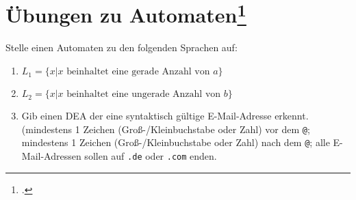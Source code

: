 \documentclass{lehramt-informatik-aufgabe}
\begin{document}
%

\section{Übungen zu Automaten\footcite[Seite 28]{theoinf:fs:1}}

Stelle einen Automaten zu den folgenden Sprachen auf:

\begin{enumerate}

%

\item $L_1 = \{ x | x \text{ beinhaltet eine gerade Anzahl von } a \}$

\item $L_2 = \{ x | x \text{ beinhaltet eine ungerade Anzahl von } b \}$

\item Gib einen DEA der eine syntaktisch gültige E-Mail-Adresse erkennt.
(mindestens 1 Zeichen (Groß-/Kleinbuchstabe oder Zahl) vor dem
\texttt{@}; mindestens 1 Zeichen (Groß-/Kleinbuchstabe oder Zahl) nach
dem \texttt{@}; alle E-Mail-Adressen sollen auf \texttt{.de} oder
\texttt{.com} enden.

\end{enumerate}
\end{document}
